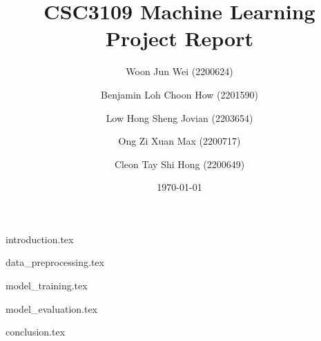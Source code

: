 \documentclass[
	article, %
	11pt, %
]{CSUniSchoolLabReport}
\title{CSC3109 Machine Learning Project Report} %
\author[1]{Woon Jun Wei (2200624)}
\author[1]{Benjamin Loh Choon How (2201590)}
\author[1]{Low Hong Sheng Jovian (2203654)}
\author[1]{Ong Zi Xuan Max (2200717)}
\author[1]{Cleon Tay Shi Hong (2200649)}
\affil[1]{Team 19}
\date{\today} %
\begin{document}
\maketitle %

\pagebreak
\tableofcontents
\pagebreak

{introduction.tex}

{data_preprocessing.tex}

{model_training.tex}




{model_evaluation.tex}

{conclusion.tex}











\end{document}
